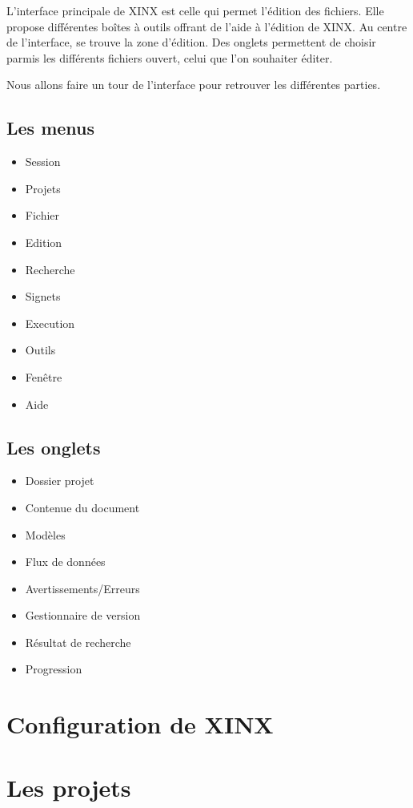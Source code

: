 \documentclass[a4paper,10pt,twoside]{book}
\begin{document}
L'interface principale de XINX est celle qui permet l'édition des fichiers. Elle propose différentes boîtes à outils offrant de l'aide à l'édition de XINX. Au centre de l'interface, se trouve la zone d'édition. Des onglets permettent de choisir parmis les différents fichiers ouvert, celui que l'on souhaiter éditer.

Nous allons faire un tour de l'interface pour retrouver les différentes parties.

\subsection{Les menus}

\begin{itemize}
  \item Session 
  \item Projets
  \item Fichier
  \item Edition
  \item Recherche
  \item Signets
  \item Execution
  \item Outils
  \item Fenêtre
  \item Aide
\end{itemize}

\subsection{Les onglets}

\begin{itemize}
  \item Dossier projet
  \item Contenue du document
  \item Modèles
  \item Flux de données
  \item Avertissements/Erreurs
  \item Gestionnaire de version
  \item Résultat de recherche
  \item Progression
\end{itemize}

\section{Configuration de XINX}

\section{Les projets}
\label{sec:Projets}
\end{document}
